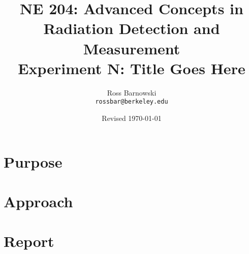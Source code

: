\documentclass[11pt]{article}
\title{%
       NE 204: Advanced Concepts in Radiation Detection and \\ Measurement \\
       \Large\bf Experiment N: Title Goes Here}
\author{Ross Barnowski \\ {\tt rossbar@berkeley.edu}}
\date{Revised \today}
\begin{document}
\maketitle

\section*{Purpose}

\section*{Approach}

\section*{Report}
\end{document}
